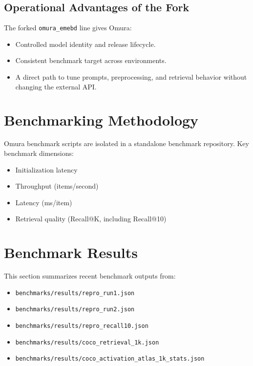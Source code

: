 \documentclass[11pt]{article}
\begin{document}
\subsection{Operational Advantages of the Fork}
The forked \texttt{omura\_emebd} line gives Omura:
\begin{itemize}[leftmargin=1.2em]
  \item Controlled model identity and release lifecycle.
  \item Consistent benchmark target across environments.
  \item A direct path to tune prompts, preprocessing, and retrieval behavior without changing the external API.
\end{itemize}

\section{Benchmarking Methodology}
Omura benchmark scripts are isolated in a standalone benchmark repository.
Key benchmark dimensions:
\begin{itemize}[leftmargin=1.2em]
  \item Initialization latency
  \item Throughput (items/second)
  \item Latency (ms/item)
  \item Retrieval quality (Recall@K, including Recall@10)
\end{itemize}

\section{Benchmark Results}
This section summarizes recent benchmark outputs from:
\begin{itemize}[leftmargin=1.2em]
  \item \texttt{benchmarks/results/repro\_run1.json}
  \item \texttt{benchmarks/results/repro\_run2.json}
  \item \texttt{benchmarks/results/repro\_recall10.json}
  \item \texttt{benchmarks/results/coco\_retrieval\_1k.json}
  \item \texttt{benchmarks/results/coco\_activation\_atlas\_1k\_stats.json}
\end{itemize}
\end{document}
